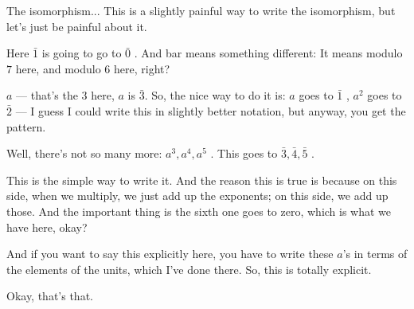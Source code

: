 \begin{speech}[00:41:19 - 00:42:48]
The isomorphism... This is a slightly painful way to write the isomorphism, but let's just be painful about it.

Here $\bar{1}$ is going to go to $\bar{0}$ . And bar means something different: It means modulo $7$ here, and modulo $6$ here, right?

$a$ --- that's the $3$ here, $a$ is $\bar{3}$. So, the nice way to do it is: $a$ goes to $\bar{1}$ , $a^2$ goes to $\bar{2}$  --- I guess I could write this in slightly better notation, but anyway, you get the pattern.

Well, there's not so many more: $a^3, a^4, a^5$ . This goes to $\bar{3}, \bar{4}, \bar{5}$ .

This is the simple way to write it. And the reason this is true is because on this side, when we multiply, we just add up the exponents; on this side, we add up those. And the important thing is the sixth one goes to zero, which is what we have here, okay?

And if you want to say this explicitly here, you have to write these $a$'s in terms of the elements of the units, which I've done there. So, this is totally explicit.

Okay, that's that. 
\end{speech}

